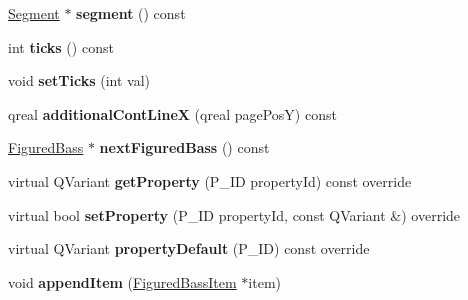 \begin{DoxyCompactItemize}
\hyperlink{class_ms_1_1_segment}{Segment} $\ast$ {\bfseries segment} () const
\item 
\mbox{\label{class_ms_1_1_figured_bass_a051730a4962ce0cdbbaed3134aa597ee}} 
int {\bfseries ticks} () const
\item 
\mbox{\label{class_ms_1_1_figured_bass_a692cc75388605b8a3788f4ba5e856d5c}} 
void {\bfseries set\+Ticks} (int val)
\item 
\mbox{\label{class_ms_1_1_figured_bass_a5b93a732f45febb5a120a4c3912e9735}} 
qreal {\bfseries additional\+Cont\+LineX} (qreal page\+PosY) const
\item 
\mbox{\label{class_ms_1_1_figured_bass_a3b63d09e8694470638d97ce65b17ab77}} 
\hyperlink{class_ms_1_1_figured_bass}{Figured\+Bass} $\ast$ {\bfseries next\+Figured\+Bass} () const
\item 
\mbox{\label{class_ms_1_1_figured_bass_a139466fab88f2e2982d0cd6ec3b206af}} 
virtual Q\+Variant {\bfseries get\+Property} (P\+\_\+\+ID property\+Id) const override
\item 
\mbox{\label{class_ms_1_1_figured_bass_a0dc2294736145b5593b9a82a55af3137}} 
virtual bool {\bfseries set\+Property} (P\+\_\+\+ID property\+Id, const Q\+Variant \&) override
\item 
\mbox{\label{class_ms_1_1_figured_bass_ae257e73c939ef5d1176d051ae47a2ec9}} 
virtual Q\+Variant {\bfseries property\+Default} (P\+\_\+\+ID) const override
\item 
\mbox{\label{class_ms_1_1_figured_bass_ae0aca273dd07850c99137405cd4ea956}} 
void {\bfseries append\+Item} (\hyperlink{class_ms_1_1_figured_bass_item}{Figured\+Bass\+Item} $\ast$item)
\end{DoxyCompactItemize}
